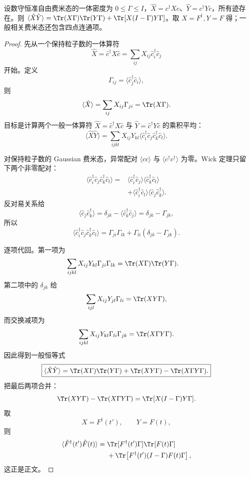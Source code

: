 \begin{lemma}[准自由费米态的一体乘积恒等式]
设数守恒准自由费米态的一体密度为 $0\le\Gamma\le I$，$\hat X=c^\dagger Xc$、$\hat Y=c^\dagger Yc$，所有迹存在。则 $\langle\hat X\hat Y\rangle=\Tr(X\Gamma)\Tr(Y\Gamma)+\Tr[X(I-\Gamma)Y\Gamma]$。取 $X=F^\dagger,Y=F$ 得；一般相关费米态还包含四点连通项。
\end{lemma}
\begin{proof}
先从一个保持粒子数的一体算符
\[
\hat X=\hat c^\dagger X\hat c
=\sum_{ij}X_{ij}\hat c_i^\dagger\hat c_j
\]
开始。定义
\[
\Gamma_{ij}=\langle\hat c_j^\dagger\hat c_i\rangle,
\]
则
\[
\langle\hat X\rangle
=\sum_{ij}X_{ij}\Gamma_{ji}
=\Tr(X\Gamma).
\]
目标是计算两个一般一体算符
$\hat X=\hat c^\dagger X\hat c$ 与
$\hat Y=\hat c^\dagger Y\hat c$ 的乘积平均：
\[
\langle\hat X\hat Y\rangle
=\sum_{ijkl}X_{ij}Y_{kl}
\langle
\hat c_i^\dagger\hat c_j
\hat c_k^\dagger\hat c_l
\rangle.
\]

对保持粒子数的 Gaussian 费米态，异常配对
$\langle cc\rangle$ 与 $\langle c^\dagger c^\dagger\rangle$ 为零。Wick 定理只留下两个非零配对：
\begin{align*}
\langle
\hat c_i^\dagger\hat c_j
\hat c_k^\dagger\hat c_l
\rangle
={}&
\langle\hat c_i^\dagger\hat c_j\rangle
\langle\hat c_k^\dagger\hat c_l\rangle\\
&+
\langle\hat c_i^\dagger\hat c_l\rangle
\langle\hat c_j\hat c_k^\dagger\rangle.
\end{align*}
反对易关系给
\[
\langle\hat c_j\hat c_k^\dagger\rangle
=\delta_{jk}-\langle\hat c_k^\dagger\hat c_j\rangle
=\delta_{jk}-\Gamma_{jk},
\]
所以
\[
\langle
\hat c_i^\dagger\hat c_j
\hat c_k^\dagger\hat c_l
\rangle
=
\Gamma_{ji}\Gamma_{lk}
+\Gamma_{li}(\delta_{jk}-\Gamma_{jk}).
\]

逐项代回。第一项为
\begin{align*}
\sum_{ijkl}X_{ij}Y_{kl}
\Gamma_{ji}\Gamma_{lk}
&=
\Tr(X\Gamma)\Tr(Y\Gamma).
\end{align*}
第二项中的 $\delta_{jk}$ 给
\[
\sum_{ijl}X_{ij}Y_{jl}\Gamma_{li}
=\Tr(XY\Gamma),
\]
而交换减项为
\[
\sum_{ijkl}X_{ij}Y_{kl}\Gamma_{li}\Gamma_{jk}
=\Tr(X\Gamma Y\Gamma).
\]
因此得到一般恒等式
\begin{equation*}
\boxed{
\langle\hat X\hat Y\rangle
=
\Tr(X\Gamma)\Tr(Y\Gamma)
+\Tr(XY\Gamma)
-\Tr(X\Gamma Y\Gamma).}
\end{equation*}
把最后两项合并：
\[
\Tr(XY\Gamma)-\Tr(X\Gamma Y\Gamma)
=
\Tr[X(I-\Gamma)Y\Gamma].
\]
取
\[
X=F^\dagger(t'),
\qquad
Y=F(t),
\]
则
\begin{align*}
\langle\hat F^\dagger(t')\hat F(t)\rangle
={}&\Tr[F^\dagger(t')\Gamma]\Tr[F(t)\Gamma]\\
&+\Tr\!\left[F^\dagger(t')(I-\Gamma)F(t)\Gamma\right],
\end{align*}
这正是正文。


\end{proof}
